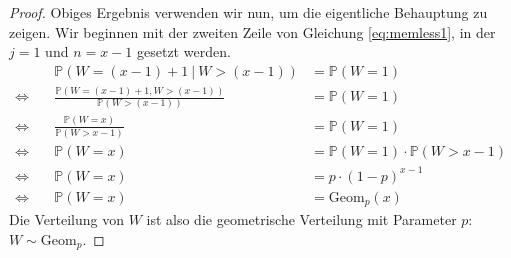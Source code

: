 \documentclass[a4paper]{scrartcl}
\newcommand{\gdw}{\Leftrightarrow}
\newcommand{\prob}{\mathbb{P}}
\begin{document}
\begin{enumerate}[label=\bfseries 1.\arabic*]
\begin{proof}
            Obiges Ergebnis verwenden wir nun, um die eigentliche Behauptung zu
            zeigen. Wir beginnen mit der zweiten Zeile von Gleichung
            \eqref{eq:memless1}, in der $j = 1$ und $n = x-1$ gesetzt werden.
            \begin{equation*}
                \begin{alignedat}{2}
                          && \prob(W = (x-1) + 1 \ |\  W > (x-1))
                          &= \prob(W = 1) \\
                    \gdw\ && \frac{\prob(W = (x-1) + 1, W > (x-1))}
                                  {\prob(W > (x-1))}
                          &= \prob(W = 1) \\
                    \gdw\ && \frac{\prob(W = x)}{\prob(W > x-1)}
                          &= \prob(W = 1) \\
                    \gdw\ && \prob(W = x)
                          &= \prob(W = 1) \cdot \prob(W > x-1) \\
                    \gdw\ && \prob(W = x)
                          &= p \cdot (1-p)^{x-1} \\
                    \gdw\ && \prob(W = x)
                          &= \text{Geom}_p(x)
                \end{alignedat}
            \end{equation*}
            Die Verteilung von $W$ ist also die geometrische Verteilung mit
            Parameter $p$: $W \sim \text{Geom}_p$.
        \end{proof}

\end{enumerate}
\end{document}
